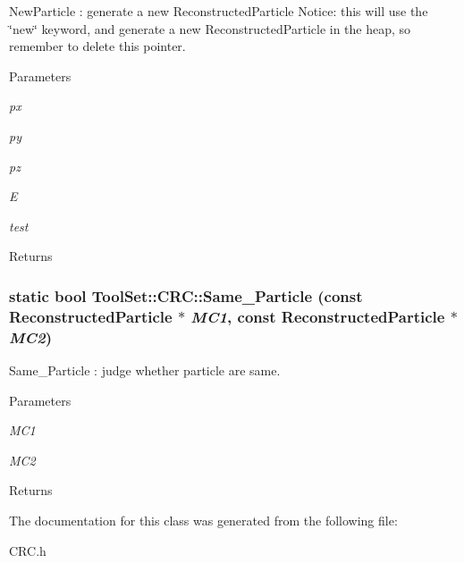 NewParticle : generate a new ReconstructedParticle Notice: this will use the \char`\"{}new\char`\"{} keyword, and generate a new ReconstructedParticle in the heap, so remember to delete this pointer. 
\begin{DoxyParams}{Parameters}
\item[{\em px}]\item[{\em py}]\item[{\em pz}]\item[{\em E}]\item[{\em test}]\end{DoxyParams}
\begin{DoxyReturn}{Returns}

\end{DoxyReturn}
\hypertarget{classToolSet_1_1CRC_a358ee6636901b5a552783d4fd9dfeec9}{
\subsubsection[{Same\_\-Particle}]{\setlength{\rightskip}{0pt plus 5cm}static bool ToolSet::CRC::Same\_\-Particle (const ReconstructedParticle $\ast$ {\em MC1}, \/  const ReconstructedParticle $\ast$ {\em MC2})}}
\label{classToolSet_1_1CRC_a358ee6636901b5a552783d4fd9dfeec9}


Same\_\-Particle : judge whether particle are same. 
\begin{DoxyParams}{Parameters}
\item[{\em MC1}]\item[{\em MC2}]\end{DoxyParams}
\begin{DoxyReturn}{Returns}

\end{DoxyReturn}


The documentation for this class was generated from the following file:\begin{DoxyCompactItemize}
\item 
CRC.h\end{DoxyCompactItemize}
